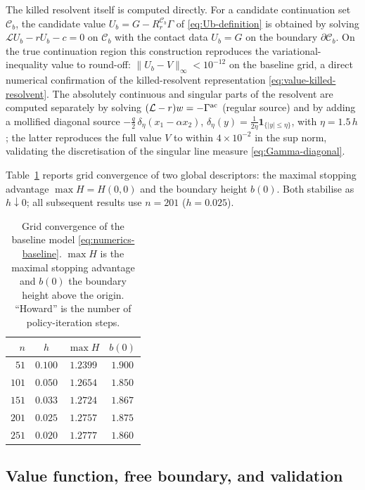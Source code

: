 \documentclass[pdflatex,sn-mathphys-num]{sn-jnl}
\theoremstyle{plain}
\theoremstyle{definition}
\theoremstyle{remark}
\numberwithin{equation}{section}
\begin{document}
The killed resolvent itself is computed directly. For a candidate continuation
set $\mathcal C_b$, the candidate value $U_b=G-R_r^{\mathcal C_b}\Gamma$ of
\eqref{eq:Ub-definition} is obtained by solving
$\mathcal LU_b-rU_b-c=0$ on $\mathcal C_b$ with the contact data $U_b=G$ on the
boundary $\partial\mathcal C_b$. On the true continuation region this construction
reproduces the variational-inequality value to round-off:
$\|U_b-V\|_\infty < 10^{-12}$ on the baseline grid, a direct numerical
confirmation of the killed-resolvent representation
\eqref{eq:value-killed-resolvent}. The absolutely continuous and singular parts
of the resolvent are computed separately by solving
$(\mathcal L-r)w=-\Gamma^{\rm ac}$ (regular source) and by adding a mollified
diagonal source $-\tfrac{q}{2}\,\delta_\eta(x_1-\alpha x_2)$,
$\delta_\eta(y)=\tfrac1{2\eta}\mathbf 1_{\{|y|\le\eta\}}$, with $\eta=1.5\,h$;
the latter reproduces the full value $V$ to within $4\times10^{-2}$ in the
sup norm, validating the discretisation of the singular line measure
\eqref{eq:Gamma-diagonal}.

Table~\ref{tab:grid} reports grid convergence of two global descriptors: the
maximal stopping advantage $\max H = H(0,0)$ and the boundary height $b(0)$.
Both stabilise as $h\downarrow0$; all subsequent results use $n=201$
($h=0.025$).

\begin{table}[t]
\centering
\caption{Grid convergence of the baseline model \eqref{eq:numerics-baseline}.
$\max H$ is the maximal stopping advantage and $b(0)$ the boundary height above
the origin. ``Howard'' is the number of policy-iteration steps.}
\label{tab:grid}
\begin{tabular}{rccc}
\toprule
$n$ & $h$ & $\max H$ & $b(0)$ \\
\midrule
$51$  & $0.100$ & $1.2399$ & $1.900$ \\
$101$ & $0.050$ & $1.2654$ & $1.850$ \\
$151$ & $0.033$ & $1.2724$ & $1.867$ \\
$201$ & $0.025$ & $1.2757$ & $1.875$ \\
$251$ & $0.020$ & $1.2777$ & $1.860$ \\
\bottomrule
\end{tabular}
\end{table}

\subsection{Value function, free boundary, and validation}
\label{subsec:numerics-value}
\end{document}
